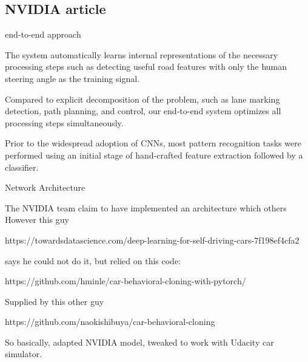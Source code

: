 \subsection{NVIDIA article}

end-to-end approach

The system automatically learns internal representations of the necessary processing steps such as detecting useful road features with only the human steering angle
as the training signal.

Compared to explicit decomposition of the problem, such as lane marking detection, path planning, and control, our end-to-end system optimizes all processing
steps simultaneously.

Prior to the widespread adoption of CNNs,
most pattern recognition tasks were performed using an initial stage of hand-crafted feature extraction followed by a classifier.

Network Architecture  

The NVIDIA team claim to have implemented an architecture which others
However this guy

https://towardsdatascience.com/deep-learning-for-self-driving-cars-7f198ef4cfa2

says he could not do it, but relied on this code:

https://github.com/hminle/car-behavioral-cloning-with-pytorch/

Supplied by this other guy

https://github.com/naokishibuya/car-behavioral-cloning

So basically, adapted NVIDIA model, tweaked to work with Udacity car simulator.


